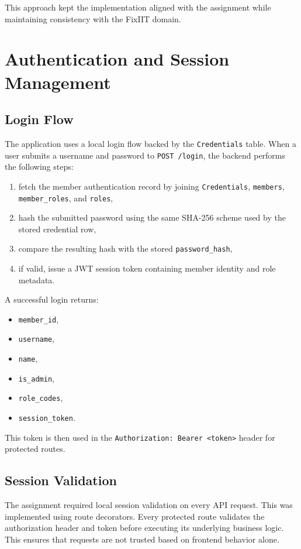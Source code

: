 \documentclass[12pt,a4paper]{article}
\begin{document}
This approach kept the implementation aligned with the assignment while maintaining consistency with the FixIIT domain.

\section{Authentication and Session Management}
\subsection{Login Flow}
The application uses a local login flow backed by the \texttt{Credentials} table. When a user submits a username and password to \texttt{POST /login}, the backend performs the following steps:
\begin{enumerate}[leftmargin=1.8em]
    \item fetch the member authentication record by joining \texttt{Credentials}, \texttt{members}, \texttt{member\_roles}, and \texttt{roles},
    \item hash the submitted password using the same SHA-256 scheme used by the stored credential row,
    \item compare the resulting hash with the stored \texttt{password\_hash},
    \item if valid, issue a JWT session token containing member identity and role metadata.
\end{enumerate}

A successful login returns:
\begin{itemize}[leftmargin=1.5em]
    \item \texttt{member\_id},
    \item \texttt{username},
    \item \texttt{name},
    \item \texttt{is\_admin},
    \item \texttt{role\_codes},
    \item \texttt{session\_token}.
\end{itemize}

This token is then used in the \texttt{Authorization: Bearer <token>} header for protected routes.

\subsection{Session Validation}
The assignment required local session validation on every API request. This was implemented using route decorators. Every protected route validates the authorization header and token before executing its underlying business logic. This ensures that requests are not trusted based on frontend behavior alone.
\end{document}
